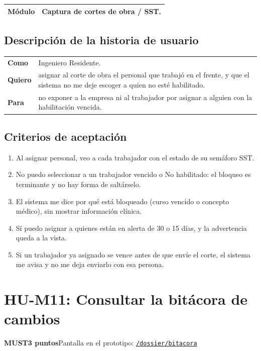 \documentclass[11pt]{article}
\newcommand{\urlapp}{https://thankstochatgpt.github.io/LOARD}
\newcommand{\app}[1]{\href{\urlapp#1}{\texttt{#1}}}
\newcommand{\etiqueta}[1]{\colorbox{barra}{\textbf{\color{marca}#1}}}
\begin{document}
\begin{tabular}{>{\bfseries}p{2.4cm} p{13.4cm}}
\toprule
Módulo & Captura de cortes de obra / SST. \\
\bottomrule
\end{tabular}

\subsection*{Descripción de la historia de usuario}

\begin{tabular}{>{\bfseries}p{2.4cm} p{13.4cm}}
\toprule
Como & Ingeniero Residente. \\
Quiero & asignar al corte de obra el personal que trabajó en el frente, y que el sistema no me deje escoger a quien no esté habilitado. \\
Para & no exponer a la empresa ni al trabajador por asignar a alguien con la habilitación vencida. \\
\bottomrule
\end{tabular}

\subsection*{Criterios de aceptación}

\begin{enumerate}
\item Al asignar personal, veo a cada trabajador con el estado de su semáforo SST.
\item No puedo seleccionar a un trabajador vencido o No habilitado: el bloqueo es terminante y no hay forma de saltárselo.
\item El sistema me dice por qué está bloqueado (curso vencido o concepto médico), sin mostrar información clínica.
\item Sí puedo asignar a quienes están en alerta de 30 o 15 días, y la advertencia queda a la vista.
\item Si un trabajador ya asignado se vence antes de que envíe el corte, el sistema me avisa y no me deja enviarlo con esa persona.
\end{enumerate}


\newpage
\section*{HU-M11: Consultar la bitácora de cambios}
\etiqueta{MUST}\quad\etiqueta{3 puntos}\quad Pantalla en el prototipo: \app{/dossier/bitacora}
\end{document}
